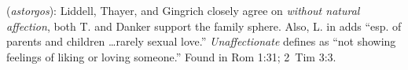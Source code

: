 \item[Unaffectionate,]

(\textit{astorgos}):
Liddell, Thayer, and Gingrich closely agree on \emph{without natural affection}, both T. and Danker support the family sphere. Also, L. in  adds ``esp. of parents and children \ldots rarely sexual love.'' \emph{Unaffectionate} defines as ``not showing feelings of liking or loving someone.''
Found in Rom 1:31; 2~Tim 3:3.

